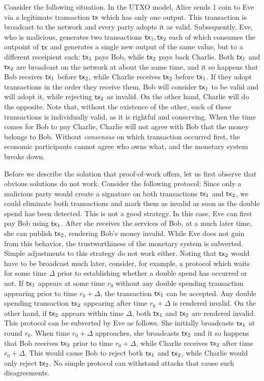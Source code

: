 Consider the following situation. In the UTXO model, Alice sends 1 coin to Eve via
a legitimate transaction $\mathsf{tx}$ which has only one output. This transaction is
broadcast to the network and every party adopts it as valid. Subsequently, Eve,
who is malicious,
generates two transactions $\mathsf{tx}_1, \mathsf{tx}_2$ each of which consumes the outpoint of
$\mathsf{tx}$ and generates a single new output of the same value, but to a different
receipient each: $\mathsf{tx}_1$ pays Bob, while $\mathsf{tx}_2$ pays back Charlie. Both
$\mathsf{tx}_1$ and $\mathsf{tx}_2$ are broadcast on the network at about the same time, and it
so happens that Bob receives $\mathsf{tx}_1$ before $\mathsf{tx}_2$, while Charlie receives
$\mathsf{tx}_2$ before $\mathsf{tx}_1$. If they adopt transactions in the order they receive
them, Bob will consider $\mathsf{tx}_1$ to be valid and will adopt it, while rejecting
$\mathsf{tx}_2$ as invalid. On the other hand, Charlie will do the opposite. Note that,
without the existence of the other, each of these transactions is individually
valid, as it is rightful and conserving.
When the time comes for Bob to pay Charlie, Charlie will not agree with Bob that
the money belongs to Bob. Without \emph{consensus} on which transaction occurred
first, the economic participants cannot agree who owns what, and the monetary
system breaks down.

Before we describe the solution that proof-of-work offers, let us first observe
that obvious solutions do not work. Consider the following protocol: Since only
a malicious party would create a signature on both transactions $\mathsf{tx}_1$ and
$\mathsf{tx}_2$, we could eliminate both transactions and mark them as invalid as soon
as the double spend has been detected. This is not a good strategy. In this
case, Eve can first pay Bob using $\mathsf{tx}_1$. After she receives the services of
Bob, at a much later time, she can publish $\mathsf{tx}_2$, rendering Bob's money
invalid. While Eve does not gain from this behavior, the trustworthiness of the
monetary system is subverted. Simple adjustments to this strategy do not work
either. Noting that $\mathsf{tx}_2$ would have to be broadcast much later, consider,
for example, a protocol which waits for some time $\Delta$ prior to establishing
whether a double spend has occurred or not. If $\mathsf{tx}_1$ appears at some time
$r_0$ without any double spending transaction appearing prior to time
$r_0 + \Delta$, the transaction $\mathsf{tx}_1$ can be accepted. Any double spending
transaction $\mathsf{tx}_2$ appearing after time $r_0 + \Delta$ is rendered invalid. On
the other hand, if $\mathsf{tx}_2$ appears within time $\Delta$, both $\mathsf{tx}_1$ and
$\mathsf{tx}_2$ are rendered invalid. This protocol can be subverted by Eve as follows.
She initially broadcasts $\mathsf{tx}_1$ at round $r_0$. When time $r_0 + \Delta$
approaches, she broadcasts $\mathsf{tx}_2$ and it so happens that Bob receives $\mathsf{tx}_2$
prior to time $r_0 + \Delta$, while Charlie receives $\mathsf{tx}_2$ after time
$r_0 + \Delta$. This would cause Bob to reject both $\mathsf{tx}_1$ and $\mathsf{tx}_2$, while
Charlie would only reject $\mathsf{tx}_2$. No simple protocol can withstand attacks that
cause such disagreements.

